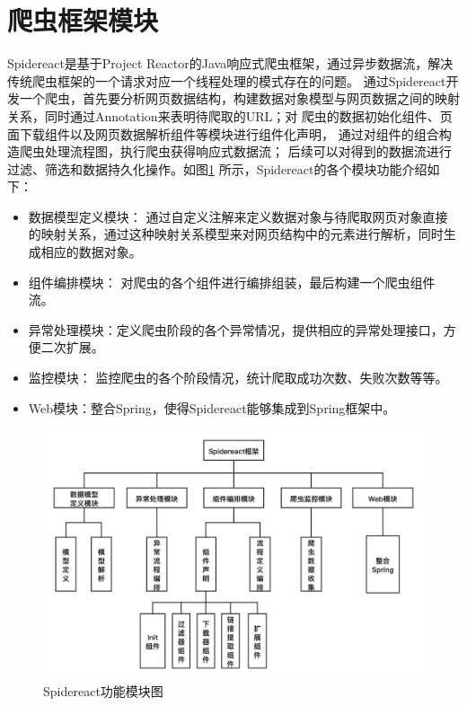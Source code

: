 \documentclass[master]{njuthesis}
\begin{document}
\section{爬虫框架模块}
  Spidereact是基于Project Reactor的Java响应式爬虫框架，通过异步数据流，解决传统爬虫框架的一个请求对应一个线程处理的模式存在的问题。
通过Spidereact开发一个爬虫，首先要分析网页数据结构，构建数据对象模型与网页数据之间的映射关系，同时通过Annotation来表明待爬取的URL；对
爬虫的数据初始化组件、页面下载组件以及网页数据解析组件等模块进行组件化声明， 通过对组件的组合构造爬虫处理流程图，执行爬虫获得响应式数据流；
后续可以对得到的数据流进行过滤、筛选和数据持久化操作。如图\ref{pic:all} 所示，Spidereact的各个模块功能介绍如下：
  \begin{itemize}
    \item 数据模型定义模块： 通过自定义注解来定义数据对象与待爬取网页对象直接的映射关系，通过这种映射关系模型来对网页结构中的元素进行解析，同时生成相应的数据对象。
    \item 组件编排模块： 对爬虫的各个组件进行编排组装，最后构建一个爬虫组件流。
    \item 异常处理模块：定义爬虫阶段的各个异常情况，提供相应的异常处理接口，方便二次扩展。
    \item 监控模块： 监控爬虫的各个阶段情况，统计爬取成功次数、失败次数等等。
    \item Web模块：整合Spring，使得Spidereact能够集成到Spring框架中。
  \end{itemize}

\begin{figure}
\centering
\includegraphics[width=\textwidth]{pic/all.png}
\caption{Spidereact功能模块图}\label{pic:all}
\end{figure}
\end{document}

